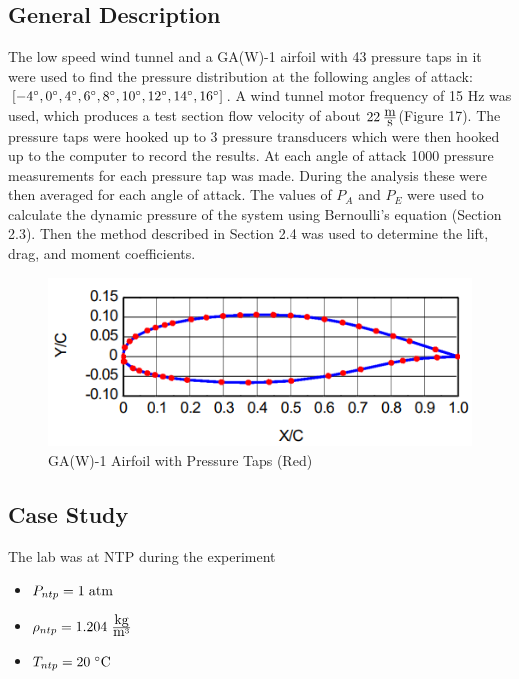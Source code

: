 \documentclass[12pt]{article}
\begin{document}
\subsection{General Description}
The low speed wind tunnel and a GA(W)-1 airfoil with 43 pressure taps in it were used to find the pressure distribution at the following angles of attack: \([ -4\degree, 0\degree, 4\degree, 6\degree, 8\degree, 10\degree, 12\degree, 14\degree, 16\degree]\). A wind tunnel motor frequency of 15 Hz was used, which produces a test section flow velocity of about \(22 \hspace{2 pt}\frac{\mbox{m}}{\mbox{s}}\)(Figure 17). The pressure taps were hooked up to 3 pressure transducers which were then hooked up to the computer to record the results. At each angle of attack 1000 pressure measurements for each pressure tap was made. During the analysis these were then averaged for each angle of attack. The values of \(P_A\) and \(P_E\) were used to calculate the dynamic pressure of the system using Bernoulli’s equation (Section 2.3). Then the method described in Section 2.4 was used to determine the lift, drag, and moment coefficients.
    \begin{figure}[h]
        \includegraphics[width=16 cm]{air.PNG}
        \centering
        \caption{GA(W)-1 Airfoil with Pressure Taps (Red)}
    \end{figure}



\subsection{Case Study}
The lab was at NTP during the experiment
\begin{itemize}
    \item \(P_{ntp} = 1 \hspace{3 pt}\mbox{atm}\)
    \item  \(\rho_{ntp} = 1.204  \hspace{3 pt}\frac{\mbox{kg}}{{\mbox{m}}^3}\)
    \item \(T_{ntp} = 20 \hspace{3 pt}\degree\mbox{C}\)
\end{itemize}
\end{document}
